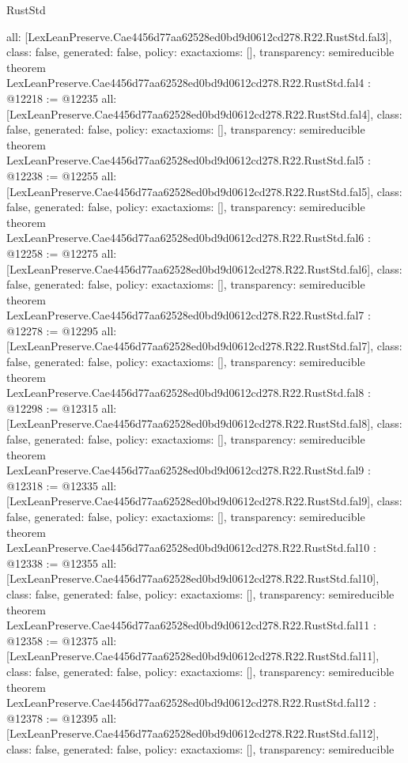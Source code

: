 \begin{lexlean}{RustStd}
\begin{coremodule}
{  all: [LexLeanPreserve.Cae4456d77aa62528ed0bd9d0612cd278.R22.RustStd.fal3],
  class: false,
  generated: false,
  policy: exact{axioms: []},
  transparency: semireducible
}
theorem LexLeanPreserve.Cae4456d77aa62528ed0bd9d0612cd278.R22.RustStd.fal4 : @12218 := @12235 {
  all: [LexLeanPreserve.Cae4456d77aa62528ed0bd9d0612cd278.R22.RustStd.fal4],
  class: false,
  generated: false,
  policy: exact{axioms: []},
  transparency: semireducible
}
theorem LexLeanPreserve.Cae4456d77aa62528ed0bd9d0612cd278.R22.RustStd.fal5 : @12238 := @12255 {
  all: [LexLeanPreserve.Cae4456d77aa62528ed0bd9d0612cd278.R22.RustStd.fal5],
  class: false,
  generated: false,
  policy: exact{axioms: []},
  transparency: semireducible
}
theorem LexLeanPreserve.Cae4456d77aa62528ed0bd9d0612cd278.R22.RustStd.fal6 : @12258 := @12275 {
  all: [LexLeanPreserve.Cae4456d77aa62528ed0bd9d0612cd278.R22.RustStd.fal6],
  class: false,
  generated: false,
  policy: exact{axioms: []},
  transparency: semireducible
}
theorem LexLeanPreserve.Cae4456d77aa62528ed0bd9d0612cd278.R22.RustStd.fal7 : @12278 := @12295 {
  all: [LexLeanPreserve.Cae4456d77aa62528ed0bd9d0612cd278.R22.RustStd.fal7],
  class: false,
  generated: false,
  policy: exact{axioms: []},
  transparency: semireducible
}
theorem LexLeanPreserve.Cae4456d77aa62528ed0bd9d0612cd278.R22.RustStd.fal8 : @12298 := @12315 {
  all: [LexLeanPreserve.Cae4456d77aa62528ed0bd9d0612cd278.R22.RustStd.fal8],
  class: false,
  generated: false,
  policy: exact{axioms: []},
  transparency: semireducible
}
theorem LexLeanPreserve.Cae4456d77aa62528ed0bd9d0612cd278.R22.RustStd.fal9 : @12318 := @12335 {
  all: [LexLeanPreserve.Cae4456d77aa62528ed0bd9d0612cd278.R22.RustStd.fal9],
  class: false,
  generated: false,
  policy: exact{axioms: []},
  transparency: semireducible
}
theorem LexLeanPreserve.Cae4456d77aa62528ed0bd9d0612cd278.R22.RustStd.fal10 : @12338 := @12355 {
  all: [LexLeanPreserve.Cae4456d77aa62528ed0bd9d0612cd278.R22.RustStd.fal10],
  class: false,
  generated: false,
  policy: exact{axioms: []},
  transparency: semireducible
}
theorem LexLeanPreserve.Cae4456d77aa62528ed0bd9d0612cd278.R22.RustStd.fal11 : @12358 := @12375 {
  all: [LexLeanPreserve.Cae4456d77aa62528ed0bd9d0612cd278.R22.RustStd.fal11],
  class: false,
  generated: false,
  policy: exact{axioms: []},
  transparency: semireducible
}
theorem LexLeanPreserve.Cae4456d77aa62528ed0bd9d0612cd278.R22.RustStd.fal12 : @12378 := @12395 {
  all: [LexLeanPreserve.Cae4456d77aa62528ed0bd9d0612cd278.R22.RustStd.fal12],
  class: false,
  generated: false,
  policy: exact{axioms: []},
  transparency: semireducible
}
\end{coremodule}
\end{lexlean}
